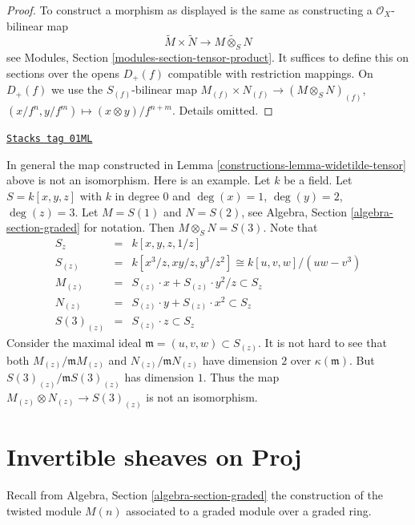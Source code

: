 \begin{proof}
To construct a morphism as displayed is the same as constructing
a $\mathcal{O}_X$-bilinear map
$$
\widetilde M \times \widetilde N
\longrightarrow
\widetilde{M \otimes_S N}
$$
see Modules, Section \ref{modules-section-tensor-product}.
It suffices to define this on sections over the opens $D_{+}(f)$
compatible with restriction mappings. On $D_{+}(f)$ we use the
$S_{(f)}$-bilinear map
$M_{(f)} \times N_{(f)} \to (M \otimes_S N)_{(f)}$,
$(x/f^n, y/f^m) \mapsto (x \otimes y)/f^{n + m}$. Details omitted.
\end{proof}

\begin{remark}
\label{constructions-remark-not-isomorphism}
\href{https://stacks.math.columbia.edu/tag/01ML}{\texttt{Stacks tag 01ML}}

In general the map constructed in Lemma \ref{constructions-lemma-widetilde-tensor}
above is not an isomorphism. Here is an example. Let $k$
be a field. Let $S = k[x, y, z]$ with $k$ in degree $0$ and
$\deg(x) = 1$, $\deg(y) = 2$, $\deg(z) = 3$.
Let $M = S(1)$ and $N = S(2)$, see
Algebra, Section \ref{algebra-section-graded}
for notation. Then $M \otimes_S N = S(3)$.
Note that
\begin{eqnarray*}
S_z
& = &
k[x, y, z, 1/z] \\
S_{(z)}
& = &
k[x^3/z, xy/z, y^3/z^2]
\cong
k[u, v, w]/(uw - v^3) \\
M_{(z)} & = & S_{(z)} \cdot x + S_{(z)} \cdot y^2/z \subset S_z \\
N_{(z)} & = & S_{(z)} \cdot y + S_{(z)} \cdot x^2 \subset S_z \\
S(3)_{(z)} & = & S_{(z)} \cdot z \subset S_z
\end{eqnarray*}
Consider the maximal ideal $\mathfrak m = (u, v, w) \subset S_{(z)}$.
It is not hard to see that both $M_{(z)}/\mathfrak mM_{(z)}$
and $N_{(z)}/\mathfrak mN_{(z)}$ have dimension $2$ over
$\kappa(\mathfrak m)$. But
$S(3)_{(z)}/\mathfrak mS(3)_{(z)}$ has dimension $1$.
Thus the map $M_{(z)} \otimes N_{(z)} \to S(3)_{(z)}$ is not
an isomorphism.
\end{remark}

\section{Invertible sheaves on Proj}
\label{constructions-section-invertible-on-proj}
Recall from Algebra, Section \ref{algebra-section-graded}
the construction of the twisted module $M(n)$ associated
to a graded module over a graded ring.

